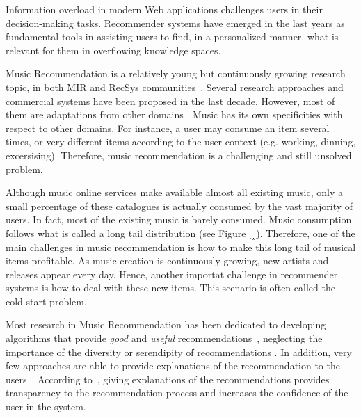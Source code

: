 Information overload in modern Web applications challenges users in their decision-making tasks. Recommender systems have emerged in the last years as fundamental tools in assisting users to find, in a personalized manner, what is relevant for them in overflowing knowledge spaces. 

Music Recommendation is a relatively young but continuously growing research topic, in both MIR and RecSys communities~\cite{oscarBook}. Several research approaches and commercial systems have been proposed in the last decade. However, most of them are adaptations from other domains \cite{oscarBook}. Music has its own specificities with respect to other domains. For instance, a user may consume an item several times, or very different items according to the user context (e.g. working, dinning, excersising). Therefore, music recommendation is a challenging and still unsolved problem.

Although music online services make available almost all existing music, only a small percentage of these catalogues is actually consumed by the vast majority of users. In fact, most of the existing music is barely consumed. Music consumption follows what is called a long tail distribution \cite{oscarBook} (see Figure~\ref{}). Therefore, one of the main challenges in music recommendation is how to make this long tail of musical items profitable. As music creation is continuously growing, new artists and releases appear every day. Hence, another importat challenge in recommender systems is how to deal with these new items. This scenario is often called the cold-start problem.

Most research in Music Recommendation has been dedicated to developing algorithms that provide \textit{good} and \textit{useful} recommendations~\cite{oscarBook}, neglecting the importance of the diversity or serendipity of recommendations \cite{TODO}. In addition, very few approaches are able to provide explanations of the recommendation to the users~\cite{Passant2008, Passant2010}. According to~\cite{celma2008new}, giving explanations of the recommendations provides transparency to the recommendation process and increases the confidence of the user in the system.


